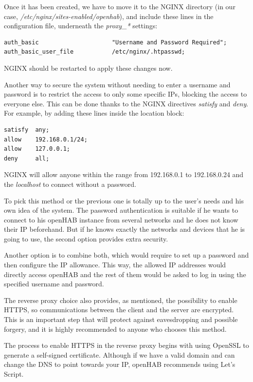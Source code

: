 Once it has been created, we have to move it to the NGINX directory (in our case, \textit{/etc/nginx/sites-enabled/openhab}), and
include these lines in the configuration file, underneath the \textit{proxy\_*} settings:

\begin{lstlisting}[style=Consola]
auth_basic                     "Username and Password Required";
auth_basic_user_file           /etc/nginx/.htpasswd;
\end{lstlisting}

NGINX should be restarted to apply these changes now.

Another way to secure the system without needing to enter a username and password is to restrict the access to only some specific
IPs, blocking the access to everyone else. This can be done thanks to the NGINX directives \textit{satisfy} and \textit{deny}.
For example, by adding these lines inside the location block:

\begin{lstlisting}[style=Consola]
satisfy  any;
allow    192.168.0.1/24;
allow    127.0.0.1;
deny     all;
\end{lstlisting}

NGINX will allow anyone within the range from 192.168.0.1 to 192.168.0.24 and the \textit{localhost} to connect without a password.

To pick this method or the previous one is totally up to the user’s needs and his own idea of the system. The password authentication
is suitable if he wants to connect to his openHAB instance from several networks and he does not know their IP beforehand. But if
he knows exactly the networks and devices that he is going to use, the second option provides extra security.

Another option is to combine both, which would require to set up a password and then configure the IP allowance. This way, the
allowed IP addresses would directly access openHAB and the rest of them would be asked to log in using the specified username and
password.

The reverse proxy choice also provides, as mentioned, the possibility to enable HTTPS, so communications between the client and
the server are encrypted. This is an important step that will protect against eavesdropping and possible forgery, and it is highly
recommended to anyone who chooses this method.

The process to enable HTTPS in the reverse proxy begins with using OpenSSL to generate a self-signed certificate. Although if we
have a valid domain and can change the DNS to point towards your IP, openHAB recommends using Let’s Script.\cite{letsEncryptWebsite}

